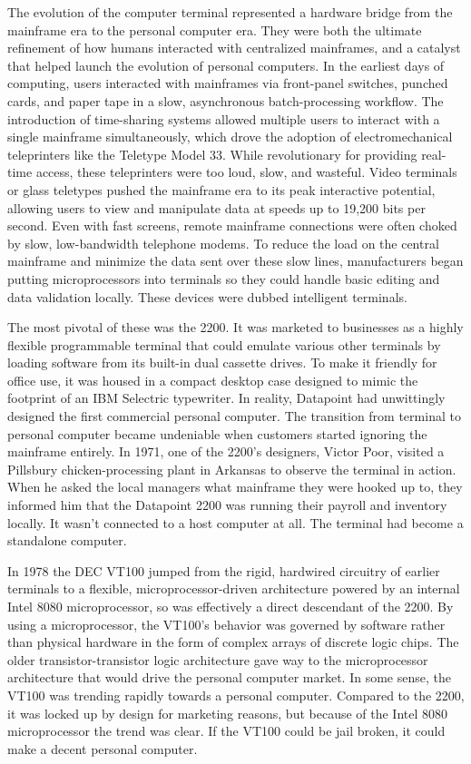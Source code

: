 The evolution of the computer terminal represented a hardware bridge from the mainframe era to the personal computer era. They were both the ultimate refinement of how humans interacted with centralized mainframes, and a catalyst that helped launch the evolution of personal computers. In the earliest days of computing, users interacted with mainframes via front-panel switches, punched cards, and paper tape in a slow, asynchronous batch-processing workflow. The introduction of time-sharing systems allowed multiple users to interact with a single mainframe simultaneously, which drove the adoption of electromechanical teleprinters like the Teletype Model 33. While revolutionary for providing real-time access, these teleprinters were too loud, slow, and wasteful. Video terminals or glass teletypes pushed the mainframe era to its peak interactive potential, allowing users to view and manipulate data at speeds up to 19,200 bits per second. Even with fast screens, remote mainframe connections were often choked by slow, low-bandwidth telephone modems. To reduce the load on the central mainframe and minimize the data sent over these slow lines, manufacturers began putting microprocessors into terminals so they could handle basic editing and data validation locally. These devices were dubbed intelligent terminals.

The most pivotal of these was the 2200. It was marketed to businesses as a highly flexible programmable terminal that could emulate various other terminals by loading software from its built-in dual cassette drives. To make it friendly for office use, it was housed in a compact desktop case designed to mimic the footprint of an IBM Selectric typewriter. In reality, Datapoint had unwittingly designed the first commercial personal computer. The transition from terminal to personal computer became undeniable when customers started ignoring the mainframe entirely. In 1971, one of the 2200's designers, Victor Poor, visited a Pillsbury chicken-processing plant in Arkansas to observe the terminal in action. When he asked the local managers what mainframe they were hooked up to, they informed him that the Datapoint 2200 was running their payroll and inventory locally. It wasn't connected to a host computer at all. The terminal had become a standalone computer.

In 1978 the DEC VT100  jumped from the rigid, hardwired circuitry of earlier terminals to a flexible, microprocessor-driven architecture powered by an internal Intel 8080 microprocessor, so was effectively a direct descendant of the 2200. By using a microprocessor, the VT100's behavior was governed by software rather than physical hardware in the form of complex arrays of discrete logic chips. The older transistor-transistor logic architecture gave way to the microprocessor architecture that would drive the personal computer market. In some sense, the VT100 was trending rapidly towards a personal computer. Compared to the 2200, it was locked up by design for marketing reasons, but because of the Intel 8080 microprocessor the trend was clear. If the VT100 could be jail broken, it could make a decent personal computer.

